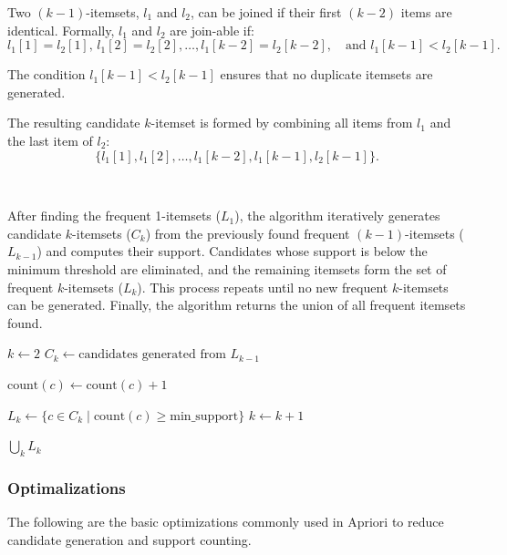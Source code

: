 Two $(k-1)$-itemsets, $l_1$ and $l_2$, can be joined if their first $(k-2)$ items are identical. Formally, $l_1$ and $l_2$ are join-able if:
\[
l_1[1] = l_2[1], \, l_1[2] = l_2[2], \dots, l_1[k-2] = l_2[k-2], \quad \text{and } l_1[k-1] < l_2[k-1].
\]

The condition $l_1[k-1] < l_2[k-1]$ ensures that no duplicate itemsets are generated.

The resulting candidate $k$-itemset is formed by combining all items from $l_1$ and the last item of $l_2$:
\[
\{l_1[1], l_1[2], \dots, l_1[k-2], l_1[k-1], l_2[k-1]\}.
\]

~\parencite{Han2012}

After finding the frequent 1-itemsets ($L_1$), the algorithm iteratively generates candidate $k$-itemsets ($C_k$) from the previously found frequent $(k-1)$-itemsets ($L_{k-1}$) and computes their support. Candidates whose support is below the minimum threshold are eliminated, and the remaining itemsets form the set of frequent $k$-itemsets ($L_k$). This process repeats until no new frequent $k$-itemsets can be generated. Finally, the algorithm returns the union of all frequent itemsets found.~\parencite{angeline2013association}

\begin{algorithm}[H]
\caption*{Apriori Algorithm (continued for $k \ge 2$) \parencite{angeline2013association}}
\begin{algorithmic}[1]

\State $k \gets 2$
    \State $C_k \gets \text{candidates generated from } L_{k-1}$
    
                \State $\text{count}(c) \gets \text{count}(c) + 1$
            \EndIf
        \EndFor
    \EndFor
    
    \State $L_k \gets \{c \in C_k \mid \text{count}(c) \geq \text{min\_support}\}$
    \State $k \gets k + 1$
\EndWhile

\State \Return $\bigcup_k L_k$

\end{algorithmic}
\end{algorithm}

\subsubsection{Optimalizations}

The following are the basic optimizations commonly used in Apriori to reduce candidate generation and support counting.

